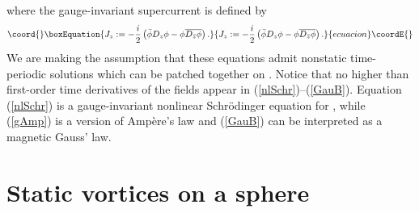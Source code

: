 \documentclass[a4paper,11pt]{article}
\begin{document}
where the gauge-invariant supercurrent \coordHE{} is defined by
\begin{equation}\coord{}\boxEquation{ \label{superc}
J_{z}:=-\frac{i}{2}\left(\bar{\phi}D_{z}\phi-
\phi \overline{D_{\bar{z}}\phi}\right).
}{ J_{z}:=-\frac{i}{2}\left(\bar{\phi}D_{z}\phi-
\phi \overline{D_{\bar{z}}\phi}\right).
}{ecuacion}\coordE{}\end{equation}
We are making the assumption that these equations admit nonstatic 
time-periodic solutions which can be patched together on \myHighlight{$\Sigma$}\coordHE{}. 
Notice that no higher than first-order time derivatives of the fields 
appear in (\ref{nlSchr})--(\ref{GauB}).
Equation (\ref{nlSchr}) is a gauge-invariant nonlinear Schr\"odinger 
equation for \myHighlight{$\phi$}\coordHE{}, while (\ref{gAmp}) is a version of Amp\`ere's law and 
(\ref{GauB}) can be interpreted as a magnetic Gauss' law.


\section{Static vortices on a sphere}
\end{document}
